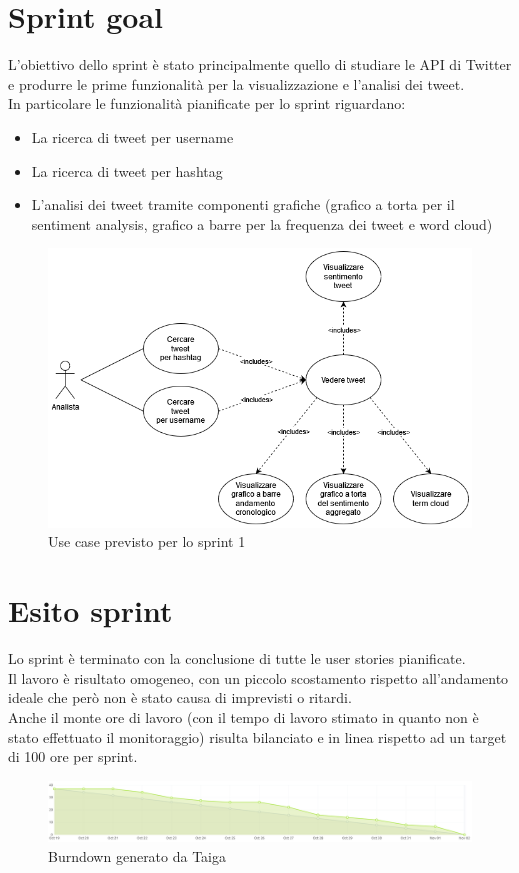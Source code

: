 \documentclass[11pt]{article}
\begin{document}
\section*{Sprint goal}
\justify
L'obiettivo dello sprint è stato principalmente quello di studiare le API di Twitter e produrre le prime funzionalità per la visualizzazione e l'analisi dei tweet.\\
In particolare le funzionalità pianificate per lo sprint riguardano:
\begin{itemize}
    \item La ricerca di tweet per username
    \item La ricerca di tweet per hashtag
    \item L'analisi dei tweet tramite componenti grafiche (grafico a torta per il sentiment analysis, grafico a barre per la frequenza dei tweet e word cloud)
\end{itemize}
\begin{figure}[H]
    \centering
    \includegraphics[width=12cm]{./img/usecase.png}
    \caption{Use case previsto per lo sprint 1}
\end{figure}

\newpage
\section*{Esito sprint}
Lo sprint è terminato con la conclusione di tutte le user stories pianificate.\\
Il lavoro è risultato omogeneo, con un piccolo scostamento rispetto all'andamento ideale 
che però non è stato causa di imprevisti o ritardi.\\
Anche il monte ore di lavoro (con il tempo di lavoro stimato in quanto non è stato effettuato il monitoraggio)
risulta bilanciato e in linea rispetto ad un target di 100 ore per sprint.
\begin{figure}[H]
    \centering
    \includegraphics[width=\textwidth]{./img/burndown.png}
    \caption{Burndown generato da Taiga}
\end{figure}
\end{document}
